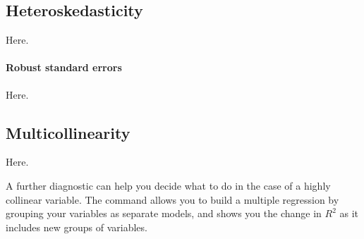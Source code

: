 	\subsection{Heteroskedasticity}%
  	\label{sec:heteroskedasticity}
  	Here.

	\paragraph{Robust standard errors}%
  	\label{sec:clustering}%
  	Here.

	\subsection{Multicollinearity}%
  	\label{sec:collinearity}%
    Here.
	
	  A further diagnostic can help you decide what to do in the case of a highly collinear variable. The  command allows you to build a multiple regression by grouping your variables as separate models, and shows you the change in $R^2$ as it includes new groups of variables.
